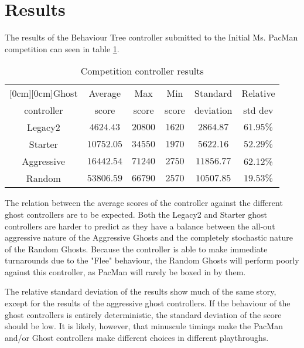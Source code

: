 \section{Results}
The results of the Behaviour Tree controller submitted to the Initial Ms. PacMan competition\cite{competition} can seen in table \ref{table-compResults}. 
\begin{table}[h]
\caption{Competition controller results}
\begin{center}
\begin{tabular}{|c|c|c|c|c|c|}
\hline
\multicolumn{1}{|c|}{\raisebox{-0.50ex}[0cm][0cm]{\!Ghost\!}}
& \multicolumn{1}{|c|}{Average}
& \multicolumn{1}{|c|}{Max}
& \multicolumn{1}{|c|}{Min} 
& \multicolumn{1}{|c|}{Standard}
& \multicolumn{1}{|c|}{Relative}\\
controller & score & score & score & deviation & std dev\\ \hline
Legacy2 &$4624.43$&$20800$&$1620$&$2864.87$ & $61.95\%$\\ \hline
Starter &$10752.05$&$34550$&$1970$&$5622.16$ & $52.29\%$\\ \hline
Aggressive &$16442.54$&$71240$&$2750$&$11856.77$ & 62.12\% \\ \hline
Random &$53806.59$&$66790$&$2570$&$10507.85$ & $19.53\%$\\ \hline
\end{tabular}
\label{table-compResults}
\end{center}
\end{table}

The relation between the average scores of the controller against the different ghost controllers are to be expected. Both the Legacy2 and Starter ghost controllers are harder to predict as they have a balance between the all-out aggressive nature of the Aggressive Ghosts and the completely stochastic nature of the Random Ghosts. Because the controller is able to make immediate turnarounds due to the "Flee" behaviour, the Random Ghosts will perform poorly against this controller, as PacMan will rarely be boxed in by them. 

The relative standard deviation of the results show much of the same story, except for the results of the aggressive ghost controllers. If the behaviour of the ghost controllers is entirely deterministic, the standard deviation of the score should be low. It is likely, however, that minuscule timings make the PacMan and/or Ghost controllers make different choices in different playthroughs.





